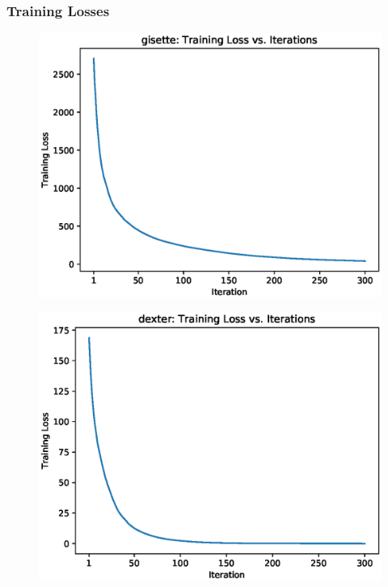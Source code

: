 \documentclass[UTF8]{article}
\begin{document}
\subsubsection{Training Losses}
\begin{figure}[H]
    \centering
    \includegraphics[scale=0.9]{./figures/gisette-loss.eps}
\end{figure}
\begin{figure}[H]
    \centering
    \includegraphics[scale=0.9]{./figures/dexter-loss.eps}
\end{figure}
\end{document}
